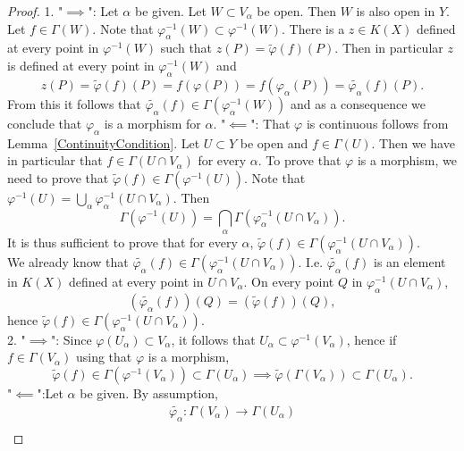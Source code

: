     \begin{proof}
        1. "$\implies$": Let $\alpha$ be given. Let $W\subset V_\alpha$ be open. Then $W$ is also open in $Y$. Let $f\in \Gamma(W)$. Note that $ \varphi_\alpha^{-1}(W) \subset \varphi^{-1}(W)$. There is a $z\in K(X)$ defined at every point in $\varphi^{-1}(W)$ such that $z(P)=\widetilde{\varphi}(f)(P)$. Then in particular $z$ is defined at every point in $\varphi_\alpha^{-1}(W)$ and 
        $$
            z(P)=\widetilde{\varphi}(f)(P)=f(\varphi(P))=f(\varphi_\alpha(P))=\widetilde{\varphi_\alpha}(f)(P).
        $$
        From this it follows that $\widetilde{\varphi_\alpha}(f)\in \Gamma(\varphi_\alpha^{-1}(W))$ and as a consequence we conclude that $\varphi_\alpha$ is a morphism for $\alpha$.
        "$\impliedby$": That $\varphi$ is continuous follows from Lemma~\ref{ContinuityCondition}. Let $U \subset Y$ be open and $f\in \Gamma(U)$. Then we have in particular that $f\in \Gamma(U\cap V_\alpha)$ for every $\alpha$. To prove that $\varphi$ is a morphism, we need to prove that $\widetilde{\varphi}(f)\in \Gamma\left(\varphi^{-1}(U)\right)$. Note that $\varphi^{-1}(U)=\bigcup_\alpha \varphi_\alpha^{-1}(U\cap V_\alpha)$. Then 
        $$\Gamma\left(\varphi^{-1}(U)\right) = \bigcap_\alpha \Gamma\left(\varphi_\alpha^{-1}(U\cap V_\alpha)\right).$$
        It is thus sufficient to prove that for every $\alpha$, $\widetilde{\varphi}(f)\in \Gamma\left(\varphi_\alpha^{-1}(U\cap V_\alpha)\right)$.\\
        We already know that $\widetilde{\varphi_\alpha}(f)\in \Gamma\left(\varphi_\alpha^{-1}(U\cap V_\alpha)\right)$. I.e. $\widetilde{\varphi_\alpha}(f)$ is an element in $K(X)$ defined at every point in $U\cap V_\alpha$. On every point $Q$ in $\varphi_\alpha^{-1}(U\cap V_\alpha)$, 
        $$\left(\widetilde{\varphi_\alpha}(f)\right)(Q)=\left(\widetilde{\varphi}(f)\right)(Q),$$
        hence $\widetilde{\varphi}(f)\in \Gamma\left(\varphi_\alpha^{-1}(U\cap V_\alpha)\right)$.\\
        2. "$\implies$": Since $\varphi(U_\alpha)\subset V_\alpha$, it follows that $U_\alpha \subset \varphi^{-1}(V_\alpha)$, hence if $f\in \Gamma(V_\alpha)$ using that $\varphi$ is a morphism, 
        $$\widetilde{\varphi}(f)\in \Gamma\left(\varphi^{-1}(V_\alpha)\right) \subset \Gamma(U_\alpha) \implies \widetilde{\varphi}\left(\Gamma(V_\alpha)\right)\subset \Gamma(U_\alpha).$$
        "$\impliedby$":Let $\alpha$ be given. By assumption, 
        \begin{gather*}
            \widetilde{\varphi_\alpha} : \Gamma(V_\alpha)\rightarrow \Gamma(U_\alpha)\\

\end{gather*}
\end{proof}
